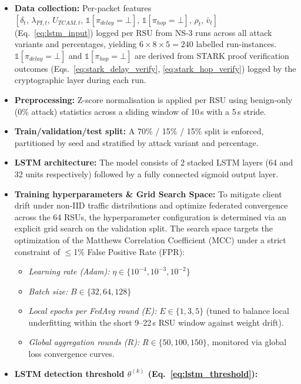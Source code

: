 \documentclass[12pt, a4paper]{report}
\begin{document}
{{\begin{itemize}
   \item \textbf{Data collection:}
    Per-packet features
    $[\delta_t,\, \lambda_{PI,t},\, U_{TCAM,t},\,
    \mathbb{1}[\pi_{delay}{=}\bot],\,
    \mathbb{1}[\pi_{hop}{=}\bot],\,
    \rho_t,\, \bar{v}_t]$
    (Eq.~\ref{eq:lstm_input}) logged per \ac{RSU}
    from NS-3 runs across all attack variants and
    percentages, yielding $6 \times 8 \times 5 = 240$
    labelled run-instances.
    $\mathbb{1}[\pi_{delay}{=}\bot]$ and
    $\mathbb{1}[\pi_{hop}{=}\bot]$ are derived from
    \ac{STARK} proof verification outcomes
    (Eqs.~\ref{eq:stark_delay_verify},
    \ref{eq:stark_hop_verify}) logged by the
    cryptographic layer during each run.
    \item \textbf{Preprocessing:} Z-score normalisation is applied per RSU using benign-only (0\% attack) statistics across a sliding window of 10\,s with a 5\,s stride.
    \item \textbf{Train/validation/test split:} A 70\% / 15\% / 15\% split is enforced, partitioned by seed and stratified by attack variant and percentage.
    \item \textbf{LSTM architecture:} The model consists of 2 stacked LSTM layers (64 and 32 units respectively) followed by a fully connected sigmoid output layer.
    \item \textbf{Training hyperparameters \& Grid Search Space:} To mitigate client drift under non-IID traffic distributions and optimize federated convergence across the 64 RSUs, the hyperparameter configuration is determined via an explicit grid search on the validation split. The search space targets the optimization of the Matthews Correlation Coefficient (MCC) under a strict constraint of $\le$1\% False Positive Rate (FPR):
    \begin{itemize}
        \item \textit{Learning rate (Adam):} $\eta \in \{10^{-4}, 10^{-3}, 10^{-2}\}$
        \item \textit{Batch size:} $B \in \{32, 64, 128\}$
        \item \textit{Local epochs per FedAvg round ($E$):} $E \in \{1, 3, 5\}$ (tuned to balance local underfitting within the short 9--22\,s RSU window against weight drift).
        \item \textit{Global aggregation rounds ($R$):} $R \in \{50, 100, 150\}$, monitored via global loss convergence curves.
    \end{itemize}
    \item \textbf{LSTM detection threshold $\theta^{(k)}$ (Eq.~\ref{eq:lstm_threshold}):}

\end{itemize}}}
\end{document}
